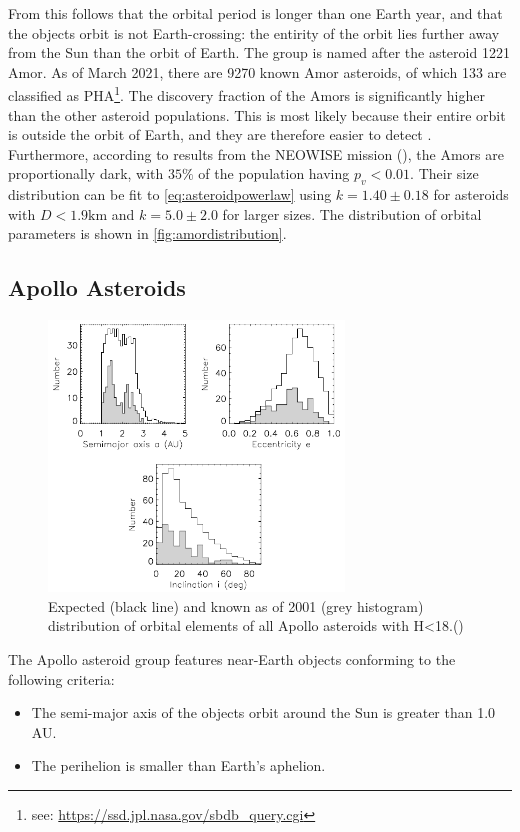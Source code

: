 From this follows that the orbital period is longer than one Earth year, and that the objects orbit is not Earth-crossing: the entirity of the orbit lies further away from the Sun than the orbit of Earth. The group is named after the asteroid 1221 Amor. As of March 2021, there are 9270 known Amor asteroids, of which 133 are classified as PHA\footnote{see: \url{https://ssd.jpl.nasa.gov/sbdb_query.cgi}}. The discovery fraction of the Amors is significantly higher than the other asteroid populations. This is most likely because their entire orbit is outside the orbit of Earth, and they are therefore easier to detect \cite{debiased}. Furthermore, according to results from the NEOWISE mission (\cite{subpopulations}), the Amors are proportionally dark, with $35\%$ of the population having $p_v < 0.01$. Their size distribution can be fit to \autoref{eq:asteroidpowerlaw} using $k = 1.40\pm0.18$ for asteroids with $D<1.9\mathrm{km}$ and $k=5.0\pm2.0$ for larger sizes. The distribution of orbital parameters is shown in \autoref{fig:amordistribution}.

\newpage
\subsection{Apollo Asteroids}
\begin{figure}[htb]
    \centering
    \includegraphics[width=0.7\textwidth]{images/apollodist.png}
    \caption{Expected (black line) and known as of 2001 (grey histogram) distribution of orbital elements of all Apollo asteroids with H<18.(\cite{debiased})}
    \label{fig:apollodistribution}
\end{figure}
The Apollo asteroid group features near-Earth objects conforming to the following criteria:
\begin{itemize}
    \item The semi-major axis of the objects orbit around the Sun is greater than 1.0 AU.
    \item The perihelion is smaller than Earth's aphelion.
\end{itemize}


